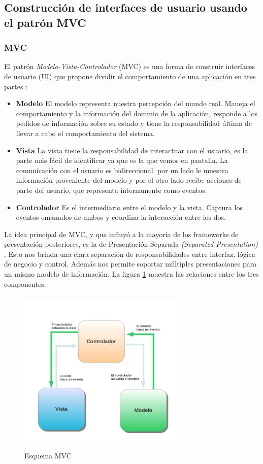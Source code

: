 \subsection{Construcción de interfaces de usuario usando el patrón MVC}
	\subsubsection{MVC}
	El patrón \emph{Modelo-Vista-Controlador} (MVC) es una forma de construir
	interfaces de usuario (UI) que propone dividir el comportamiento de una
	aplicación en tres partes \cite{reenskaug79}:
		\begin {itemize}
		\item {\bf Modelo}
			El modelo representa nuestra percepción del mundo real. 
			Maneja el comportamiento y la información del dominio de la aplicación,
			responde a los pedidos de información sobre su estado y tiene la
			responsabilidad última de llevar a cabo el comportamiento del sistema.
			
		\item {\bf Vista}
			La vista tiene la responsabilidad de interactuar con el usuario, es la
			parte más fácil de identificar ya que es la que vemos en pantalla.
			La comunicación con el usuario es bidireccional:
			por un lado le muestra información proveniente del modelo y por el otro lado
			recibe acciones de parte del usuario, que representa internamente como eventos.
			
		\item {\bf Controlador}
			Es el intermediario entre el modelo y la vista.
			Captura los eventos emanados de ambos y coordina la interacción entre los
			dos.
	\end {itemize}
	 
	La idea principal de MVC, y que influyó a la mayoría de los frameworks de
	presentación posteriores, es la de Presentación Separada \emph{(Separated
	Presentation)} \cite{burbeck87}.
	Esto nos brinda una clara separación de responsabilidades entre interfaz,
	lógica de negocio y control. Además nos permite soportar múltiples
	presentaciones para un mismo modelo de información.
	La figura \ref{mvc} muestra las relaciones entre los tres componentes.  
	
	\begin{figure}[h]
		\centering
		\includegraphics[width=300px, height=300px]{img/mvc} 
		\caption{Esquema MVC}
		\label{mvc}
	\end{figure}  
	
